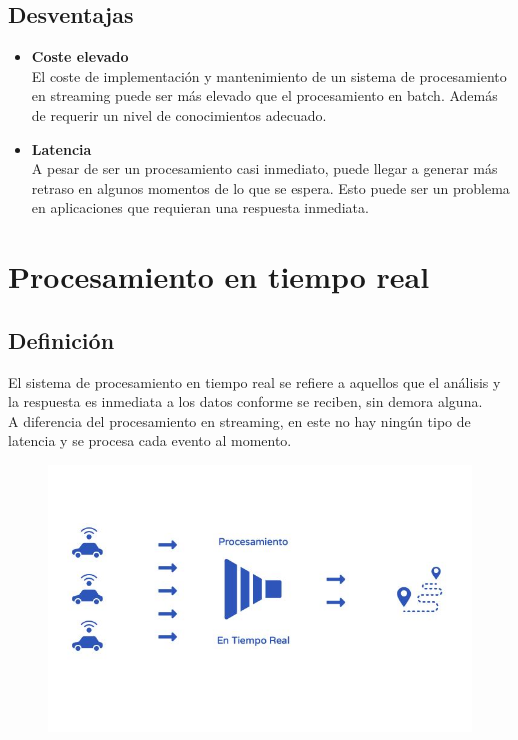 \documentclass[12pt]{article}
\begin{document}
\subsection{Desventajas}

\begin{itemize}
    \item \textbf{Coste elevado}\\
    El coste de implementación y mantenimiento de un sistema de procesamiento en streaming puede ser más elevado que
    el procesamiento en batch. Además de requerir un nivel de conocimientos adecuado.
    \item \textbf{Latencia}\\
    A pesar de ser un procesamiento casi inmediato, puede llegar a generar más retraso en algunos momentos de lo que
    se espera. Esto puede ser un problema en aplicaciones que requieran una respuesta inmediata.
\end{itemize}

\clearpage

\section{Procesamiento en tiempo real}

\subsection{Definición}

El sistema de procesamiento en tiempo real se refiere a aquellos que el análisis y la respuesta es inmediata a los datos conforme se
reciben, sin demora alguna.
\\
A diferencia del procesamiento en streaming, en este no hay ningún tipo de latencia y se procesa cada evento al momento.

\begin{figure}[h!]
    \centering
    \includegraphics[width=.6\textwidth]{TiempoReal.jpg}
    \label{fig:my_label}
\end{figure}
\end{document}
